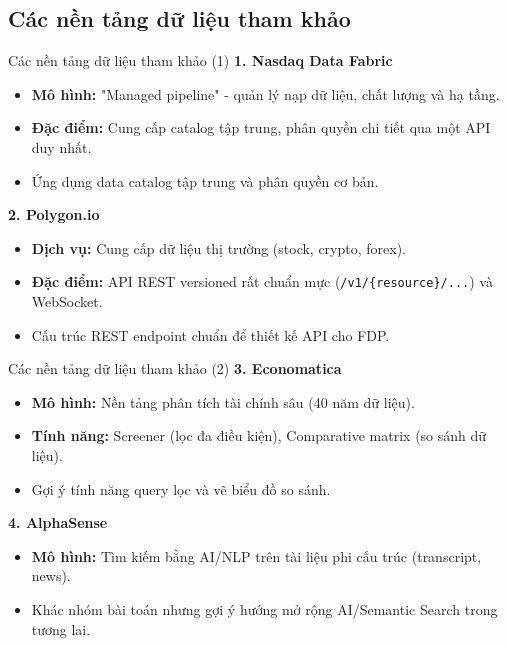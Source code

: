 \documentclass[t, aspectratio=169]{beamer} %
\begin{document}
	\subsection{Các nền tảng dữ liệu tham khảo}
	\begin{frame}{Các nền tảng dữ liệu tham khảo (1)}
		\textbf{1. Nasdaq Data Fabric}
		\begin{itemize}
			\item \textbf{Mô hình:} "Managed pipeline" - quản lý nạp dữ liệu, chất lượng và hạ tầng.
			\item \textbf{Đặc điểm:} Cung cấp catalog tập trung, phân quyền chi tiết qua một API duy nhất.
			\item[$\rightarrow$] Ứng dụng data catalog tập trung và phân quyền cơ bản.
		\end{itemize}
		
		\vspace{1em}
		
		\textbf{2. Polygon.io}
		\begin{itemize}
			\item \textbf{Dịch vụ:} Cung cấp dữ liệu thị trường (stock, crypto, forex).
			\item \textbf{Đặc điểm:} API REST versioned rất chuẩn mực (\texttt{/v1/\{resource\}/...}) và WebSocket.
			\item[$\rightarrow$] Cấu trúc REST endpoint chuẩn để thiết kế API cho FDP.
		\end{itemize}
	\end{frame}

	\begin{frame}{Các nền tảng dữ liệu tham khảo (2)}
		\textbf{3. Economatica}
		\begin{itemize}
			\item \textbf{Mô hình:} Nền tảng phân tích tài chính sâu (40 năm dữ liệu).
			\item \textbf{Tính năng:} Screener (lọc đa điều kiện), Comparative matrix (so sánh dữ liệu).
			\item[$\rightarrow$] Gợi ý tính năng query lọc và vẽ biểu đồ so sánh.
		\end{itemize}
		
		\vspace{1em}
		
		\textbf{4. AlphaSense}
		\begin{itemize}
			\item \textbf{Mô hình:} Tìm kiếm bằng AI/NLP trên tài liệu phi cấu trúc (transcript, news).
			\item[$\rightarrow$] Khác nhóm bài toán nhưng gợi ý hướng mở rộng AI/Semantic Search trong tương lai.
		\end{itemize}
	\end{frame}
	
\end{document}
